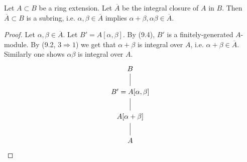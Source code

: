 \documentclass[12pt]{article}
\begin{document}
\begin{proposition}
	Let $A\subset B$ be a ring extension. Let $\overline{A}$ be the integral closure of $A$ in $B$. Then $\overline{A}\subset B$ is a subring, i.e. $\alpha,\beta\in\overline{A}$ implies $\alpha+\beta,\alpha\beta\in\overline{A}$. 
\end{proposition}
\begin{proof}
	Let $\alpha,\beta\in\overline{A}$. Let $B'=A[\alpha,\beta]$. By (9.4), $B'$ is a finitely-generated $A$-module. By (9.2, $3\Rightarrow 1$) we get that $\alpha+\beta$ is integral over $A$, i.e. $\alpha+\beta\in\overline{A}$. Similarly one shows $\alpha\beta$ is integral over $A$.
	\begin{equation*}
\begin{tikzcd}
B                                       \\
{B'=A[\alpha,\beta]} \arrow[u, no head] \\
{A[\alpha+\beta]} \arrow[u, no head]    \\
A \arrow[u, no head]                   
\end{tikzcd}
	\end{equation*}
\end{proof}
\end{document}
